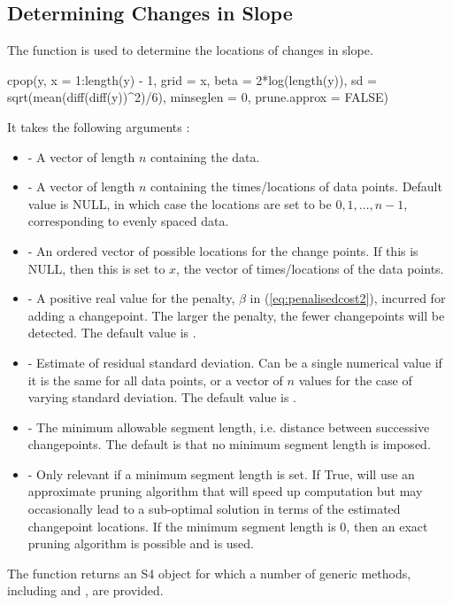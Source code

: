 \documentclass[nojss]{jss}
\begin{document}
\subsection{Determining Changes in Slope}
%
%
The function  is used to determine the locations of changes in slope.
%
%
\begin{CodeInput}
cpop(y, x = 1:length(y) - 1, grid = x, beta = 2*log(length(y)), 
    sd =  sqrt(mean(diff(diff(y))^2)/6), minseglen = 0, 
    prune.approx = FALSE)
\end{CodeInput}
It takes the following arguments :
%
%
\begin{itemize}
 \item  {} - A vector of length $n$ containing the data.
\item {} -  A vector of length $n$ containing the times/locations of data points. Default value is NULL, in which case the locations are set to be $0,1,\ldots,n-1$, corresponding to evenly spaced data.
\item {} -  An ordered vector of possible locations for the change points. If this is NULL, then this is set to $x$, the vector of times/locations of the data points.
\item {} -  A positive real value for the penalty, $\beta$ in (\ref{eq:penalisedcost2}), incurred for adding a changepoint. The larger the penalty, the fewer changepoints will be detected. The default value is .
\item {} - Estimate of residual standard deviation. Can be a single numerical value if it is the same for all data points, or a vector of $n$ values for the case of varying standard deviation. The default value is .
\item {} -  The minimum allowable segment length, i.e. distance between successive changepoints. The default is that no minimum segment length is imposed.
\item {} -  Only relevant if a minimum segment length is set. If True,  will use an approximate pruning algorithm that will speed up computation but may occasionally lead to a sub-optimal solution in terms of the estimated changepoint locations. If the minimum segment length is 0, then an exact pruning algorithm is possible and is used.
\end{itemize}
The  function returns an S4 object for which a number of generic methods, including  and , are provided. 
\end{document}
